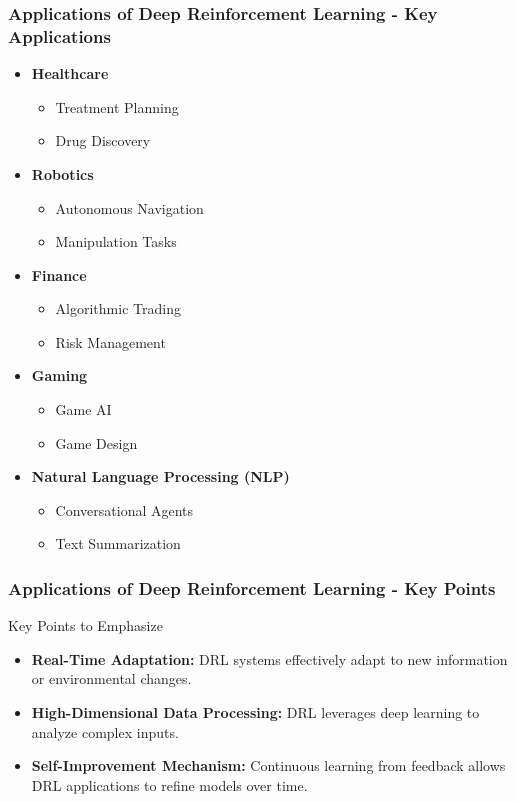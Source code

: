 \documentclass[aspectratio=169]{beamer}
\begin{document}
\begin{frame}[fragile]
    \frametitle{Applications of Deep Reinforcement Learning - Key Applications}
    \begin{itemize}
        \item \textbf{Healthcare}
            \begin{itemize}
                \item Treatment Planning
                \item Drug Discovery
            \end{itemize}
        \item \textbf{Robotics}
            \begin{itemize}
                \item Autonomous Navigation
                \item Manipulation Tasks
            \end{itemize}
        \item \textbf{Finance}
            \begin{itemize}
                \item Algorithmic Trading
                \item Risk Management
            \end{itemize}
        \item \textbf{Gaming}
            \begin{itemize}
                \item Game AI
                \item Game Design
            \end{itemize}
        \item \textbf{Natural Language Processing (NLP)}
            \begin{itemize}
                \item Conversational Agents
                \item Text Summarization
            \end{itemize}
    \end{itemize}
\end{frame}

\begin{frame}[fragile]
    \frametitle{Applications of Deep Reinforcement Learning - Key Points}
    \begin{block}{Key Points to Emphasize}
        \begin{itemize}
            \item \textbf{Real-Time Adaptation:} DRL systems effectively adapt to new information or environmental changes.
            \item \textbf{High-Dimensional Data Processing:} DRL leverages deep learning to analyze complex inputs.
            \item \textbf{Self-Improvement Mechanism:} Continuous learning from feedback allows DRL applications to refine models over time.
        \end{itemize}
    \end{block}
\end{frame}
\end{document}
